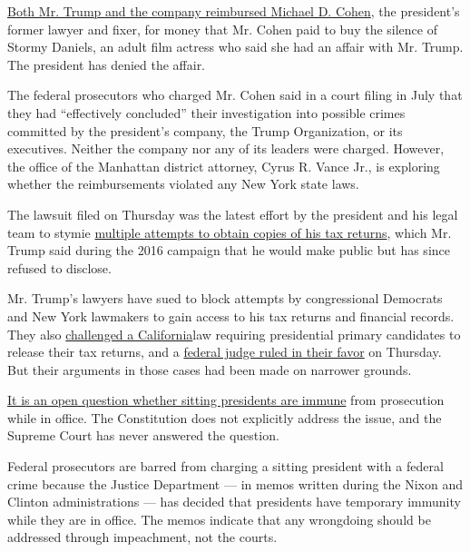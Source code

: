 \href{https://www.nytimes.com/2018/08/21/nyregion/michael-cohen-plea-deal-trump.html}{Both
Mr. Trump and the company reimbursed Michael D. Cohen}, the president's
former lawyer and fixer, for money that Mr. Cohen paid to buy the
silence of Stormy Daniels, an adult film actress who said she had an
affair with Mr. Trump. The president has denied the affair.

The federal prosecutors who charged Mr. Cohen said in a court filing in
July that they had ``effectively concluded'' their investigation into
possible crimes committed by the president's company, the Trump
Organization, or its executives. Neither the company nor any of its
leaders were charged. However, the office of the Manhattan district
attorney, Cyrus R. Vance Jr., is exploring whether the reimbursements
violated any New York state laws.

The lawsuit filed on Thursday was the latest effort by the president and
his legal team to stymie
\href{https://www.nytimes.com/2019/08/13/us/politics/trump-house-lawsuits.html?module=inline}{multiple
attempts to obtain copies of his tax returns}, which Mr. Trump said
during the 2016 campaign that he would make public but has since refused
to disclose.

Mr. Trump's lawyers have sued to block attempts by congressional
Democrats and New York lawmakers to gain access to his tax returns and
financial records. They also
\href{https://www.nytimes.com/2019/08/06/us/politics/california-trump-tax-returns.html?module=inline}{challenged
a California}law requiring presidential primary candidates to release
their tax returns, and a
\href{https://www.latimes.com/california/story/2019-09-19/trump-tax-returns-federal-court-challenge-california}{federal
judge ruled in their favor} on Thursday. But their arguments in those
cases had been made on narrower grounds.

\href{https://www.nytimes.com/2017/05/29/us/politics/a-constitutional-puzzle-can-the-president-be-indicted.html?module=inline}{It
is an open question whether sitting presidents are immune} from
prosecution while in office. The Constitution does not explicitly
address the issue, and the Supreme Court has never answered the
question.

Federal prosecutors are barred from charging a sitting president with a
federal crime because the Justice Department --- in memos written during
the Nixon and Clinton administrations --- has decided that presidents
have temporary immunity while they are in office. The memos indicate
that any wrongdoing should be addressed through impeachment, not the
courts.

